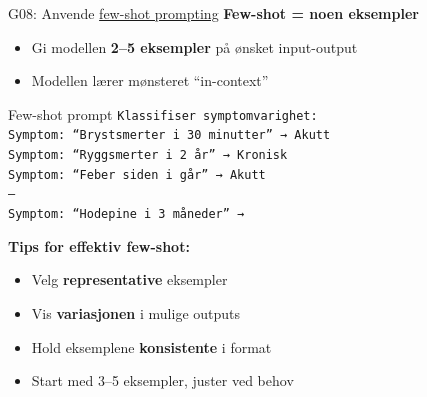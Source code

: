 \documentclass[aspectratio=169, 10pt]{beamer}
\begin{document}
\begin{frame}{G08: Anvende \href{https://en.wikipedia.org/wiki/Few-shot_learning}{few-shot prompting}}
    \textbf{Few-shot = noen eksempler}
    
    \begin{itemize}
        \item Gi modellen \textbf{2--5 eksempler} på ønsket input-output
        \item Modellen lærer mønsteret ``in-context''
    \end{itemize}
    
    \vspace{0.3cm}
    \begin{block}{Few-shot prompt}
        \small
        \texttt{Klassifiser symptomvarighet:} \\
        \texttt{Symptom: ``Brystsmerter i 30 minutter'' → Akutt} \\
        \texttt{Symptom: ``Ryggsmerter i 2 år'' → Kronisk} \\
        \texttt{Symptom: ``Feber siden i går'' → Akutt} \\
        \texttt{---} \\
        \texttt{Symptom: ``Hodepine i 3 måneder'' →}
    \end{block}
    
    \vspace{0.3cm}
    \textbf{Tips for effektiv few-shot:}
    \begin{itemize}
        \item Velg \textbf{representative} eksempler
        \item Vis \textbf{variasjonen} i mulige outputs
        \item Hold eksemplene \textbf{konsistente} i format
        \item Start med 3--5 eksempler, juster ved behov
    \end{itemize}
\end{frame}
\end{document}
